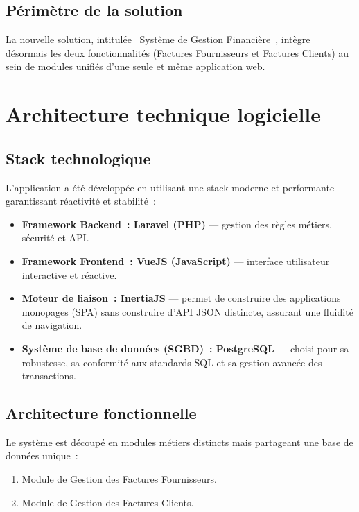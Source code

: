\documentclass[11pt,a4paper]{article}
\begin{document}
\subsection{Périmètre de la solution}
La nouvelle solution, intitulée \og~Système de Gestion Financière~\fg{}, intègre désormais les deux fonctionnalités (Factures Fournisseurs et Factures Clients) au sein de modules unifiés d'une seule et même application web.

\section{Architecture technique logicielle}

\subsection{Stack technologique}
L'application a été développée en utilisant une stack moderne et performante garantissant réactivité et stabilité~:

\begin{itemize}
  \item \textbf{Framework Backend~: Laravel (PHP)} --- gestion des règles métiers, sécurité et API.
  \item \textbf{Framework Frontend~: VueJS (JavaScript)} --- interface utilisateur interactive et réactive.
  \item \textbf{Moteur de liaison~: InertiaJS} --- permet de construire des applications monopages (SPA) sans construire d'API JSON distincte, assurant une fluidité de navigation.
  \item \textbf{Système de base de données (SGBD)~: PostgreSQL} --- choisi pour sa robustesse, sa conformité aux standards SQL et sa gestion avancée des transactions.
\end{itemize}

\subsection{Architecture fonctionnelle}
Le système est découpé en modules métiers distincts mais partageant une base de données unique~:

\begin{enumerate}
  \item Module de Gestion des Factures Fournisseurs.
  \item Module de Gestion des Factures Clients.
\end{enumerate}
\end{document}
